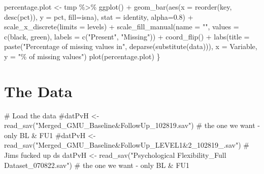 \documentclass[
  letterpaper,
  DIV=11,
  numbers=noendperiod]{scrartcl}
\newenvironment{Shaded}{\begin{snugshade}}{\end{snugshade}}
\newcommand{\AttributeTok}[1]{\textcolor[rgb]{0.40,0.45,0.13}{#1}}
\newcommand{\CommentTok}[1]{\textcolor[rgb]{0.37,0.37,0.37}{#1}}
\newcommand{\FloatTok}[1]{\textcolor[rgb]{0.68,0.00,0.00}{#1}}
\newcommand{\FunctionTok}[1]{\textcolor[rgb]{0.28,0.35,0.67}{#1}}
\newcommand{\NormalTok}[1]{\textcolor[rgb]{0.00,0.23,0.31}{#1}}
\newcommand{\OtherTok}[1]{\textcolor[rgb]{0.00,0.23,0.31}{#1}}
\newcommand{\SpecialCharTok}[1]{\textcolor[rgb]{0.37,0.37,0.37}{#1}}
\newcommand{\StringTok}[1]{\textcolor[rgb]{0.13,0.47,0.30}{#1}}
\begin{document}
\begin{Shaded}
\begin{Highlighting}[]
\NormalTok{  percentage.plot }\OtherTok{\textless{}{-}}\NormalTok{ tmp }\SpecialCharTok{\%\textgreater{}\%}
    \FunctionTok{ggplot}\NormalTok{() }\SpecialCharTok{+}
    \FunctionTok{geom\_bar}\NormalTok{(}\FunctionTok{aes}\NormalTok{(}\AttributeTok{x =} \FunctionTok{reorder}\NormalTok{(key, }\FunctionTok{desc}\NormalTok{(pct)), }
                 \AttributeTok{y =}\NormalTok{ pct, }\AttributeTok{fill=}\NormalTok{isna), }
             \AttributeTok{stat =} \StringTok{\textquotesingle{}identity\textquotesingle{}}\NormalTok{, }\AttributeTok{alpha=}\FloatTok{0.8}\NormalTok{) }\SpecialCharTok{+}
    \FunctionTok{scale\_x\_discrete}\NormalTok{(}\AttributeTok{limits =}\NormalTok{ levels) }\SpecialCharTok{+}
    \FunctionTok{scale\_fill\_manual}\NormalTok{(}\AttributeTok{name =} \StringTok{""}\NormalTok{, }
                      \AttributeTok{values =} \FunctionTok{c}\NormalTok{(}\StringTok{\textquotesingle{}black\textquotesingle{}}\NormalTok{, }\StringTok{\textquotesingle{}green\textquotesingle{}}\NormalTok{), }
                      \AttributeTok{labels =} \FunctionTok{c}\NormalTok{(}\StringTok{"Present"}\NormalTok{, }\StringTok{"Missing"}\NormalTok{)) }\SpecialCharTok{+}
    \FunctionTok{coord\_flip}\NormalTok{() }\SpecialCharTok{+}
    \FunctionTok{labs}\NormalTok{(}\AttributeTok{title =} \FunctionTok{paste}\NormalTok{(}\StringTok{"Percentage of missing values in"}\NormalTok{, }\FunctionTok{deparse}\NormalTok{(}\FunctionTok{substitute}\NormalTok{(data))),          }\AttributeTok{x =} \StringTok{\textquotesingle{}Variable\textquotesingle{}}\NormalTok{, }
         \AttributeTok{y =} \StringTok{"\% of missing values"}\NormalTok{)}
  \FunctionTok{plot}\NormalTok{(percentage.plot)}
\NormalTok{\}}
\end{Highlighting}
\end{Shaded}

\section{The Data}\label{the-data}

\begin{Shaded}
\begin{Highlighting}[]
\CommentTok{\# Load the data}
\CommentTok{\#datPvH \textless{}{-} read\_sav("Merged\_GMU\_Baseline\&FollowUp\_102819.sav") \# the one we want {-} only BL \& FU1}
\CommentTok{\#datPvH \textless{}{-} read\_sav("Merged\_GMU\_Baseline\&FollowUp\_LEVEL1\&2\_102819\_.sav") \# Jim\textquotesingle{}s fucked up ds}
\NormalTok{datPvH }\OtherTok{\textless{}{-}} \FunctionTok{read\_sav}\NormalTok{(}\StringTok{"Psychological Flexibility\_Full Dataset\_070822.sav"}\NormalTok{) }\CommentTok{\# the one we want {-} only BL \& FU1}
\end{Highlighting}
\end{Shaded}
\end{document}
